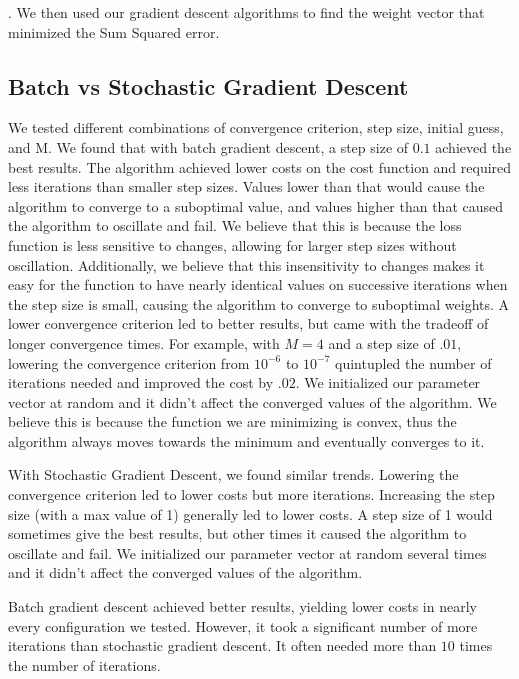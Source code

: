 \documentclass[a4paper,twoside]{article}
\begin{document}
. We then used our gradient descent algorithms to find the weight vector that minimized the Sum Squared error. 

\subsection{Batch vs Stochastic Gradient Descent}

We tested different combinations of convergence criterion, step size, initial guess, and M. We found that with batch gradient descent, a step size of $0.1$ achieved the best results. The algorithm achieved lower costs on the cost function and required less iterations than smaller step sizes. Values lower than that would cause the algorithm to converge to a suboptimal value, and values higher than that caused the algorithm to oscillate and fail. We believe that this is because the loss function is less sensitive to changes, allowing for larger step sizes without oscillation. Additionally, we believe that this insensitivity to changes makes it easy for the function to have nearly identical values on successive iterations when the step size is small, causing the algorithm to converge to suboptimal weights. A lower convergence criterion led to better results, but came with the tradeoff of longer convergence times. For example, with $M=4$ and a step size of $.01$, lowering the convergence criterion from $10^{-6}$ to $10^{-7}$ quintupled the number of iterations needed and improved the cost by $.02$. We initialized our parameter vector at random and it didn't affect the converged values of the algorithm. We believe this is because the function we are minimizing is convex, thus the algorithm always moves towards the minimum and eventually converges to it. 

With Stochastic Gradient Descent, we found similar trends. Lowering the convergence criterion led to lower costs but more iterations. Increasing the step size (with a max value of 1) generally led to lower costs. A step size of 1 would sometimes give the best results, but other times it caused the algorithm to oscillate and fail. We initialized our parameter vector at random several times and it didn't affect the converged values of the algorithm.  

Batch gradient descent achieved better results, yielding lower costs in nearly every configuration we tested. However, it took a significant number of more iterations than stochastic gradient descent. It often needed more than $10$ times the number of iterations. 
\end{document}
